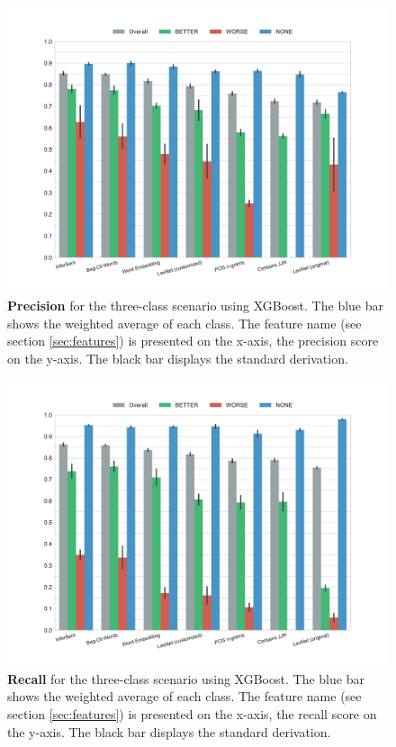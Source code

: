 \begin{figure}[htbp]
         \caption{\textbf{Precision} for the three-class scenario using XGBoost. The blue bar shows the weighted average of each class. The feature name (see section \ref{sec:features}) is presented on the x-axis, the precision score on the y-axis. The black bar displays the standard derivation.} 
    \label{fig:3_precision}
 \centering
	\includegraphics[width=1\textwidth]{images/experiments/precision-False}
\end{figure}

  \begin{figure}[htbp]
              \caption{\textbf{Recall} for the three-class scenario using XGBoost. The blue bar shows the weighted average of each class. The feature name (see section \ref{sec:features}) is presented on the x-axis, the recall score on the y-axis. The black bar displays the standard derivation.} 
       \label{fig:3_recall}
 \centering
	\includegraphics[width=1\textwidth]{images/experiments/recall-False}
\end{figure}



